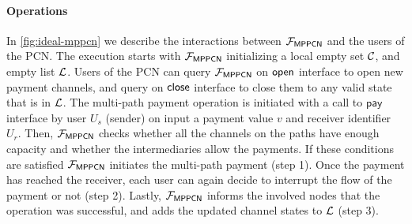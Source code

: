 \paragraph{Operations}
In \cref{fig:ideal-mppcn} we describe the interactions between $\mathcal{F}_{\mathsf{MPPCN}}$ and the 
users of the PCN. The execution starts with $\mathcal{F}_{\mathsf{MPPCN}}$ initializing a local empty 
set $\mathcal{C}$, and empty list $\mathcal{L}$. Users of the PCN can query $\mathcal{F}_{\mathsf{MPPCN}}$ on $\mathsf{open}$ 
interface to open new payment channels, and query on $\mathsf{close}$ interface to close them to any 
valid state that is in $\mathcal{L}$. The multi-path payment operation is initiated with a call to 
$\mathsf{pay}$ interface by user $U_s$ (sender) on input a payment value $v$ and receiver 
identifier $U_r$. Then, $\mathcal{F}_{\mathsf{MPPCN}}$ checks whether all the channels on the paths 
have enough capacity and whether the intermediaries allow the payments. If these conditions are 
satisfied $\mathcal{F}_{\mathsf{MPPCN}}$ initiates the multi-path payment (step 1). Once the payment has 
reached the receiver, each user can again decide to interrupt the flow of the payment or not 
(step 2). Lastly, $\mathcal{F}_{\mathsf{MPPCN}}$ informs the involved nodes that the operation was 
successful, and adds the updated channel states to $\mathcal{L}$ (step 3).


